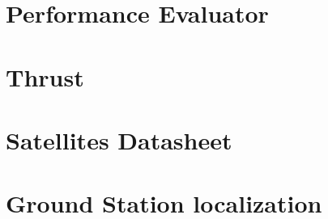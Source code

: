 \section{Performance Evaluator}
\label{PerformanceEvaluator}


\section{Thrust}
\label{Thrust}



\section{Satellites Datasheet}
\label{SatsDatashhet}


\section{Ground Station localization}
\label{GSlocalization}



